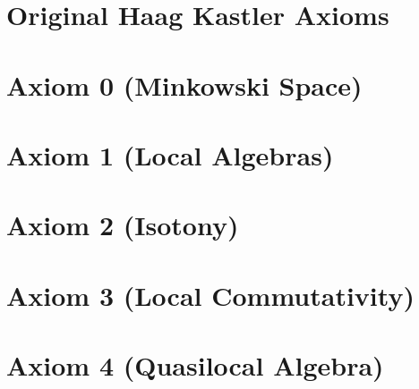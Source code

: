 
\pagebreak

\tableofcontents
\pagebreak

\chapter{Original Haag Kastler Axioms}\label{chptr:original-haag-kastler-axioms}



\chapter{Axiom 0 (Minkowski Space)}\label{chptr:axiom-0-(minkowski-space)}






\chapter{Axiom 1 (Local Algebras)}\label{chptr:axiom-1-(local-algebras)}



\chapter{Axiom 2 (Isotony)}\label{chptr:axiom-2-(isotony)}





\chapter{Axiom 3 (Local Commutativity)}\label{chptr:axiom-3-(local-commutativity)}




\chapter{Axiom 4 (Quasilocal Algebra)}\label{chptr:axiom-4-(quasilocal-algebra)}





